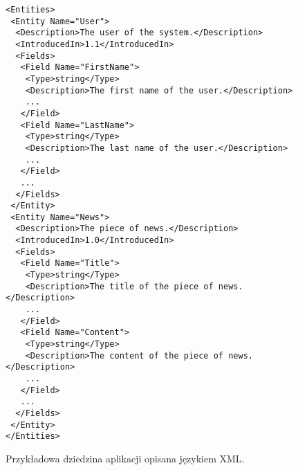 \begin{figure}[!ht]
\begin{verbatim}
<Entities>
 <Entity Name="User">
  <Description>The user of the system.</Description>
  <IntroducedIn>1.1</IntroducedIn>
  <Fields>
   <Field Name="FirstName">
    <Type>string</Type>
    <Description>The first name of the user.</Description>
    ...
   </Field>
   <Field Name="LastName">
    <Type>string</Type>
    <Description>The last name of the user.</Description>
    ...
   </Field>
   ...
  </Fields>
 </Entity>
 <Entity Name="News">
  <Description>The piece of news.</Description>
  <IntroducedIn>1.0</IntroducedIn>
  <Fields>
   <Field Name="Title">
    <Type>string</Type>
    <Description>The title of the piece of news.</Description>
    ...
   </Field>
   <Field Name="Content">
    <Type>string</Type>
    <Description>The content of the piece of news.</Description>
    ...
   </Field>
   ...
  </Fields>
 </Entity>
</Entities>
\end{verbatim}

\caption{Przykładowa dziedzina aplikacji opisana językiem XML.}
\label{fig:implementation_core:xml}
\end{figure}
